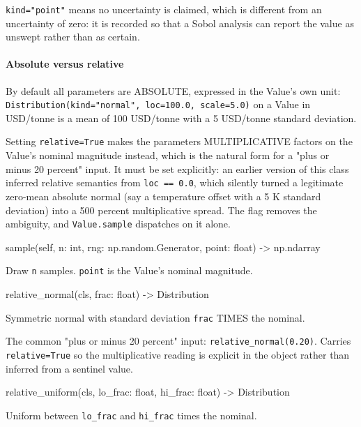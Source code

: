 \documentclass[10pt,a4paper,twoside]{report}
\begin{document}
\texttt{kind="point"} means no uncertainty is claimed, which is different from an uncertainty of zero: it is recorded so that a Sobol analysis can report the value as unswept rather than as certain.

\paragraph*{Absolute versus relative}

By default all parameters are ABSOLUTE, expressed in the Value's own unit: \texttt{Distribution(kind="normal", loc=100.0, scale=5.0)} on a Value in USD/tonne is a mean of 100 USD/tonne with a 5 USD/tonne standard deviation.

Setting \texttt{relative=True} makes the parameters MULTIPLICATIVE factors on the Value's nominal magnitude instead, which is the natural form for a "plus or minus 20 percent" input. It must be set explicitly: an earlier version of this class inferred relative semantics from \texttt{loc == 0.0}, which silently turned a legitimate zero-mean absolute normal (say a temperature offset with a 5 K standard deviation) into a 500 percent multiplicative spread. The flag removes the ambiguity, and \texttt{Value.sample} dispatches on it alone.

\begin{verbatimsmall}
sample(self, n: int, rng: np.random.Generator, point: float) -> np.ndarray
\end{verbatimsmall}

Draw \texttt{n} samples. \texttt{point} is the Value's nominal magnitude.

\begin{verbatimsmall}
relative_normal(cls, frac: float) -> Distribution
\end{verbatimsmall}

Symmetric normal with standard deviation \texttt{frac} TIMES the nominal.

The common "plus or minus 20 percent" input: \texttt{relative\_normal(0.20)}. Carries \texttt{relative=True} so the multiplicative reading is explicit in the object rather than inferred from a sentinel value.

\begin{verbatimsmall}
relative_uniform(cls, lo_frac: float, hi_frac: float) -> Distribution
\end{verbatimsmall}

Uniform between \texttt{lo\_frac} and \texttt{hi\_frac} times the nominal.
\end{document}
